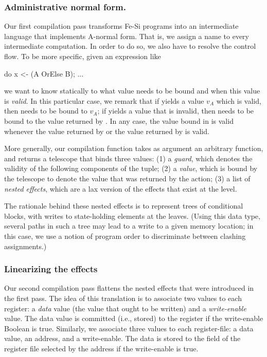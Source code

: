 \documentclass{llncs}
\begin{document}
\subsubsection{Administrative normal form.} Our first compilation pass
transforms Fe-Si programs into an intermediate language that
implements A-normal form. That is, we assign a name to every
intermediate computation.
%
In order to do so, we also have to resolve the control flow. To be
more specific, given an expression like
\begin{mcoq}
do x <- (A OrElse B); ... 
\end{mcoq}
we want to know statically to what value  needs to be bound
and when this value is \emph{valid}. 
%
In this particular case, we remark that if  yields a value
$v_A$ which is valid, then  needs to be bound to $v_A$; if
 yields a value that is invalid, then  needs to be
bound to the value returned by . In any case, the value bound
in  is valid whenever the value returned by  or the
value returned by  is valid.

More generally, our compilation function takes as argument an
arbitrary function, and returns a telescope that binds three values:
(1) a \emph{guard}, which denotes the validity of the following
components of the tuple; %
(2) a \emph{value}, which is bound by the telescope to denote the value
that was returned by the action; %
(3) a list of \emph{nested effects}, which are a lax version of the
effects that exist at the  level.

The rationale behind these nested effects is to represent trees of
conditional blocks, with writes to state-holding elements at the
leaves. (Using this data type, several paths in such a tree may lead
to a write to a given memory location; in this case, we use a notion
of program order to discriminate between clashing assignments.)

\subsubsection{Linearizing the effects} Our second compilation pass
flattens the nested effects that were introduced in the first pass.
%
The idea of this translation is to associate two values to each
register: a \emph{data} value (the value that ought to be written) and
a \emph{write-enable} value. The data value is committed (i.e., stored)
to the register if the write-enable Boolean is true.
%
Similarly, we associate three values to each register-file: a data value, an
address, and a write-enable. The data is stored to the field of the
register file selected by the address if the write-enable is true.  
\end{document}
